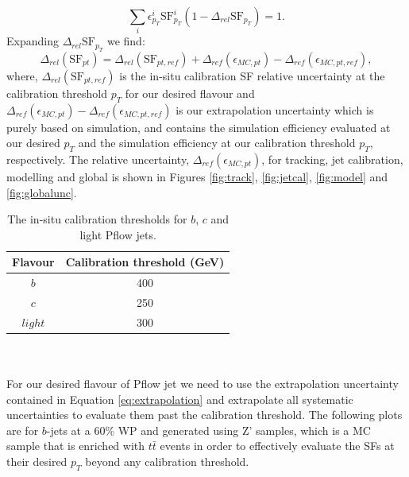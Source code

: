 \begin{equation*}
    \sum_{i} \epsilon^{i}_{p_T} \text{SF}^{i}_{p_T} (1-\Delta_{rel} \text{SF}_{p_T}) = 1.
\end{equation*}
Expanding $\Delta_{rel} \text{SF}_{p_T}$ we find:
\begin{equation}
     \Delta_{rel}(\text{SF}_{pt})=\Delta_{rel}(\text{SF}_{pt,ref})+\Delta_{ref}(\epsilon_{MC,pt})-\Delta_{ref}(\epsilon_{MC,pt,ref}),
        \label{eq:extrapolation}
\end{equation}
where, $\Delta_{rel}(\text{SF}_{pt,ref})$ is the in-situ calibration SF relative uncertainty at the calibration threshold $p_T$ for our desired flavour and $\Delta_{ref}(\epsilon_{MC,pt})-\Delta_{ref}(\epsilon_{MC,pt,ref})$ is our extrapolation uncertainty which is purely based on simulation, and contains the simulation efficiency evaluated at our desired $p_T$ and the simulation efficiency at our calibration threshold $p_T$, respectively. The relative uncertainty, $\Delta_{ref}(\epsilon_{MC,pt})$, for tracking, jet calibration, modelling and global is shown in Figures \ref{fig:track}, \ref{fig:jetcal}, \ref{fig:model} and \ref{fig:globalunc}. 
\begin{table}[h!]
    \centering
    \begin{tabular}{|c|c|}\hline
         Flavour&  Calibration threshold (GeV)\\\hline
         $b$&  400\\\hline
         $c$&  250\\\hline
         $light$&  300\\ \hline
    \end{tabular}
    \caption{The in-situ calibration thresholds for $b$, $c$ and light Pflow jets. }
    \label{tab:calibration_thresholds}
\end{table}
\\
\\
For our desired flavour of Pflow jet we need to use the extrapolation uncertainty contained in Equation \ref{eq:extrapolation} and extrapolate all systematic uncertainties to evaluate them past the calibration threshold. The following plots are for $b$-jets at a 60\% WP and generated using Z' samples, which is a MC sample that is enriched with $t\bar{t}$ events in order to effectively evaluate the SFs at their desired $p_T$ beyond any calibration threshold. 

